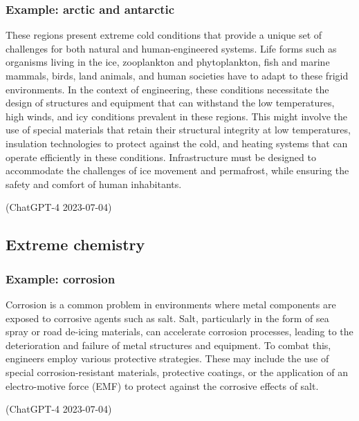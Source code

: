 \subsubsection{Example: arctic and antarctic}
\begin{quoting}
    These regions present extreme cold conditions that provide a unique set of challenges for both natural and human-engineered systems. Life forms such as organisms living in the ice, zooplankton and phytoplankton, fish and marine mammals, birds, land animals, and human societies have to adapt to these frigid environments. In the context of engineering, these conditions necessitate the design of structures and equipment that can withstand the low temperatures, high winds, and icy conditions prevalent in these regions. This might involve the use of special materials that retain their structural integrity at low temperatures, insulation technologies to protect against the cold, and heating systems that can operate efficiently in these conditions. Infrastructure must be designed to accommodate the challenges of ice movement and permafrost, while ensuring the safety and comfort of human inhabitants.

    (ChatGPT-4 2023-07-04)
\end{quoting}
\subsection{Extreme chemistry}
\subsubsection{Example: corrosion}
\begin{quoting}
    Corrosion is a common problem in environments where metal components are exposed to corrosive agents such as salt. Salt, particularly in the form of sea spray or road de-icing materials, can accelerate corrosion processes, leading to the deterioration and failure of metal structures and equipment. To combat this, engineers employ various protective strategies. These may include the use of special corrosion-resistant materials, protective coatings, or the application of an electro-motive force (EMF) to protect against the corrosive effects of salt.

    (ChatGPT-4 2023-07-04)
\end{quoting}
